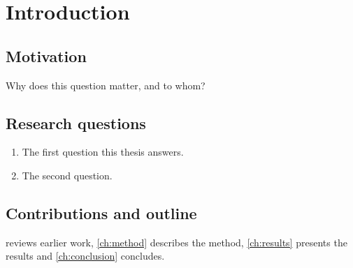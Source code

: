 \chapter{Introduction}
\label{ch:introduction}

\section{Motivation}
Why does this question matter, and to whom?

\section{Research questions}
\begin{enumerate}
  \item The first question this thesis answers.
  \item The second question.
\end{enumerate}

\section{Contributions and outline}
 reviews earlier work, \cref{ch:method} describes the
method, \cref{ch:results} presents the results and \cref{ch:conclusion}
concludes.
